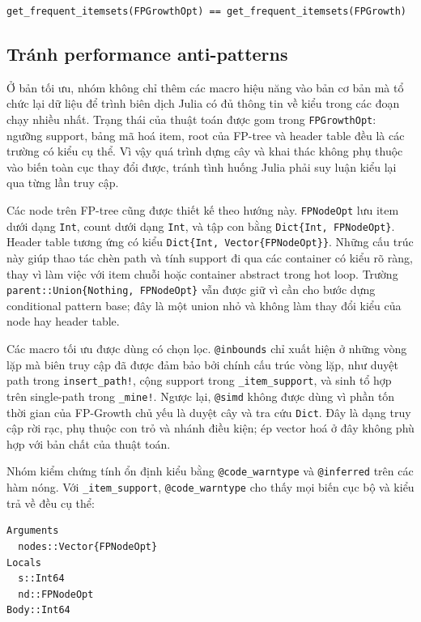 \begin{center}
\texttt{get\_frequent\_itemsets(FPGrowthOpt) == get\_frequent\_itemsets(FPGrowth)}
\end{center}

\subsection{Tránh performance anti-patterns}

Ở bản tối ưu, nhóm không chỉ thêm các macro hiệu năng vào bản cơ bản mà tổ chức lại dữ liệu để trình biên dịch Julia có đủ thông tin về kiểu trong các đoạn chạy nhiều nhất. Trạng thái của thuật toán được gom trong \texttt{FPGrowthOpt}: ngưỡng support, bảng mã hoá item, root của FP-tree và header table đều là các trường có kiểu cụ thể. Vì vậy quá trình dựng cây và khai thác không phụ thuộc vào biến toàn cục thay đổi được, tránh tình huống Julia phải suy luận kiểu lại qua từng lần truy cập.

Các node trên FP-tree cũng được thiết kế theo hướng này. \texttt{FPNodeOpt} lưu item dưới dạng \texttt{Int}, count dưới dạng \texttt{Int}, và tập con bằng \texttt{Dict\{Int, FPNodeOpt\}}. Header table tương ứng có kiểu \texttt{Dict\{Int, Vector\{FPNodeOpt\}\}}. Những cấu trúc này giúp thao tác chèn path và tính support đi qua các container có kiểu rõ ràng, thay vì làm việc với item chuỗi hoặc container abstract trong hot loop. Trường \texttt{parent::Union\{Nothing, FPNodeOpt\}} vẫn được giữ vì cần cho bước dựng conditional pattern base; đây là một union nhỏ và không làm thay đổi kiểu của node hay header table.

Các macro tối ưu được dùng có chọn lọc. \texttt{@inbounds} chỉ xuất hiện ở những vòng lặp mà biên truy cập đã được đảm bảo bởi chính cấu trúc vòng lặp, như duyệt path trong \texttt{insert\_path!}, cộng support trong \texttt{\_item\_support}, và sinh tổ hợp trên single-path trong \texttt{\_mine!}. Ngược lại, \texttt{@simd} không được dùng vì phần tốn thời gian của FP-Growth chủ yếu là duyệt cây và tra cứu \texttt{Dict}. Đây là dạng truy cập rời rạc, phụ thuộc con trỏ và nhánh điều kiện; ép vector hoá ở đây không phù hợp với bản chất của thuật toán.

Nhóm kiểm chứng tính ổn định kiểu bằng \texttt{@code\_warntype} và \texttt{@inferred} trên các hàm nóng. Với \texttt{\_item\_support}, \texttt{@code\_warntype} cho thấy mọi biến cục bộ và kiểu trả về đều cụ thể:

\begin{verbatim}
Arguments
  nodes::Vector{FPNodeOpt}
Locals
  s::Int64
  nd::FPNodeOpt
Body::Int64
\end{verbatim}

